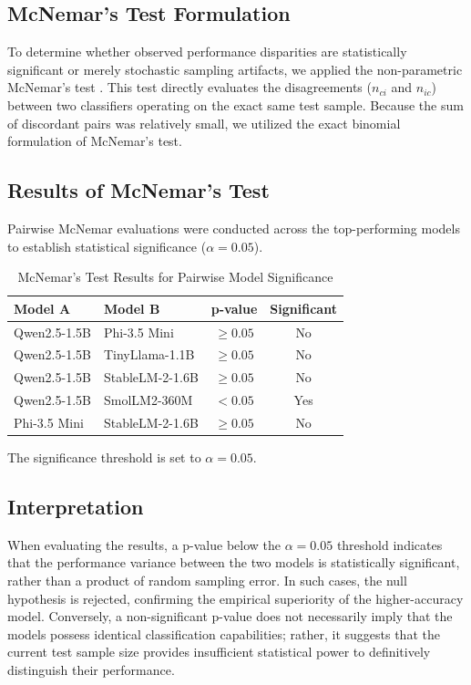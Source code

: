 \documentclass[journal]{IEEEtran}
\begin{document}
\subsection{McNemar's Test Formulation}

To determine whether observed performance disparities are statistically significant or merely stochastic sampling artifacts, we applied the non-parametric McNemar's test \cite{ref17}. This test directly evaluates the disagreements ($n_{ci}$ and $n_{ic}$) between two classifiers operating on the exact same test sample. Because the sum of discordant pairs was relatively small, we utilized the exact binomial formulation of McNemar's test.

\subsection{Results of McNemar's Test}

Pairwise McNemar evaluations were conducted across the top-performing models to establish statistical significance ($\alpha = 0.05$).

\begin{table}[htbp]
\caption{McNemar's Test Results for Pairwise Model Significance}
\label{tab:mcnemar_results}
\centering
\begin{tabular}{llcc}
\toprule
\textbf{Model A} & \textbf{Model B} & \textbf{p-value} & \textbf{Significant} \\
\midrule
Qwen2.5-1.5B & Phi-3.5 Mini & $\ge 0.05$ & No \\
Qwen2.5-1.5B & TinyLlama-1.1B & $\ge 0.05$ & No \\
Qwen2.5-1.5B & StableLM-2-1.6B & $\ge 0.05$ & No \\
Qwen2.5-1.5B & SmolLM2-360M & $<0.05$ & Yes \\
Phi-3.5 Mini & StableLM-2-1.6B & $\ge 0.05$ & No \\
\bottomrule
\end{tabular}
\end{table}

The significance threshold is set to $\alpha = 0.05$.

\subsection{Interpretation}

When evaluating the results, a p-value below the $\alpha = 0.05$ threshold indicates that the performance variance between the two models is statistically significant, rather than a product of random sampling error. In such cases, the null hypothesis is rejected, confirming the empirical superiority of the higher-accuracy model. Conversely, a non-significant p-value does not necessarily imply that the models possess identical classification capabilities; rather, it suggests that the current test sample size provides insufficient statistical power to definitively distinguish their performance.
\end{document}
